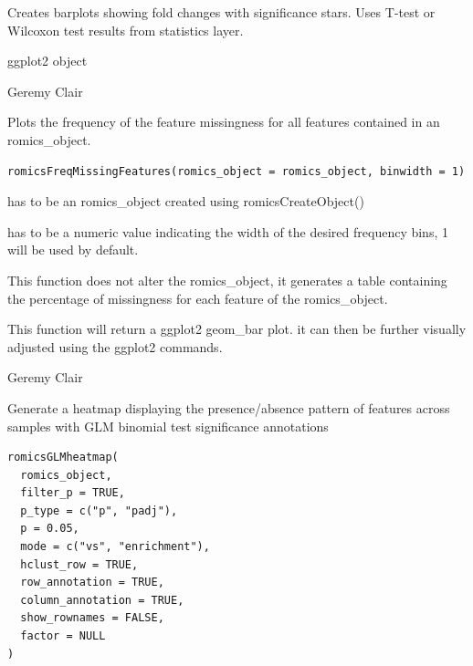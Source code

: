 \documentclass[a4paper]{book}
\begin{document}
%
\begin{Details}
Creates barplots showing fold changes with significance stars. Uses T-test or Wilcoxon test results from statistics layer.
\end{Details}
%
\begin{Value}
ggplot2 object
\end{Value}
%
\begin{Author}
Geremy Clair
\end{Author}
%
\begin{Description}
Plots the frequency of the feature missingness for all features contained in an romics\_object.
\end{Description}
%
\begin{Usage}
\begin{verbatim}
romicsFreqMissingFeatures(romics_object = romics_object, binwidth = 1)
\end{verbatim}
\end{Usage}
%
\begin{Arguments}
\begin{ldescription}
\item[\code{romics\_object}] has to be an romics\_object created using romicsCreateObject()

\item[\code{binwidth}] has to be a numeric value indicating the width of the desired frequency bins, 1 will be used by default.
\end{ldescription}
\end{Arguments}
%
\begin{Details}
This function does not alter the romics\_object, it generates a table containing the percentage of missingness for each feature of the romics\_object.
\end{Details}
%
\begin{Value}
This function will return a ggplot2 geom\_bar plot. it can then be further visually adjusted using the ggplot2 commands.
\end{Value}
%
\begin{Author}
Geremy Clair
\end{Author}
%
\begin{Description}
Generate a heatmap displaying the presence/absence pattern of features across samples with GLM binomial test significance annotations
\end{Description}
%
\begin{Usage}
\begin{verbatim}
romicsGLMheatmap(
  romics_object,
  filter_p = TRUE,
  p_type = c("p", "padj"),
  p = 0.05,
  mode = c("vs", "enrichment"),
  hclust_row = TRUE,
  row_annotation = TRUE,
  column_annotation = TRUE,
  show_rownames = FALSE,
  factor = NULL
)
\end{verbatim}
\end{Usage}
\end{document}
